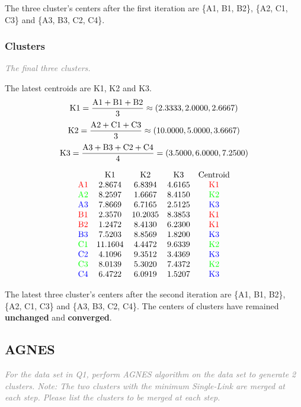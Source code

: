 \documentclass{article}
\begin{document}
The three cluster's centers after the first iteration are \{A1, B1, B2\}, \{A2, C1, C3\} and \{A3, B3, C2, C4\}.



\subsubsection{Clusters}
\textcolor{gray}{\it The final three clusters.}

The latest centroids are K1, K2 and K3.
\[ \rm K1=\dfrac{A1+B1+B2}{3}\approx(2.3333,2.0000,2.6667) \]
\[ \rm K2=\dfrac{A2+C1+C3}{3}\approx(10.0000, 5.0000, 3.6667) \]
\[ \rm K3=\dfrac{A3+B3+C2+C4}{4}=(3.5000,6.0000,7.2500) \]


\begin{align*}
    \begin{matrix}
         & \rm K1 & \rm K2 & \rm K3 & \rm Centroid \\
        \rm \color{red}A1 & 2.8674 & 6.8394 & 4.6165 & \rm \color{red}K1 \\
        \rm \color{green}A2 & 8.2597 & 1.6667 & 8.4150 & \rm \color{green}K2 \\
        \rm \color{blue}A3 & 7.8669 & 6.7165 & 2.5125 & \rm \color{blue}K3 \\
        \rm \color{red}B1 & 2.3570 & 10.2035 & 8.3853 & \rm \color{red}K1 \\
        \rm \color{red}B2 & 1.2472 & 8.4130 & 6.2300 & \rm \color{red}K1 \\
        \rm \color{blue}B3 & 7.5203 & 8.8569 & 1.8200 & \rm \color{blue}K3 \\
        \rm \color{green}C1 & 11.1604 & 4.4472 & 9.6339 & \rm \color{green}K2 \\
        \rm \color{blue}C2 & 4.1096 & 9.3512 & 3.4369 & \rm \color{blue}K3 \\
        \rm \color{green}C3 & 8.0139 & 5.3020 & 7.4372 & \rm \color{green}K2 \\
        \rm \color{blue}C4 & 6.4722 & 6.0919 & 1.5207 & \rm \color{blue}K3 \\
    \end{matrix}
\end{align*}

The latest three cluster's centers after the second iteration are \{A1, B1, B2\}, \{A2, C1, C3\} and \{A3, B3, C2, C4\}. The centers of clusters have remained \textbf{unchanged} and \textbf{converged}.



\subsection{AGNES}
\textcolor{gray}{\it For the data set in Q1, perform AGNES algorithm on the data set to generate 2 clusters. Note: The two clusters with the minimum Single-Link are merged at each step. Please list the clusters to be merged at each step.}
\end{document}
